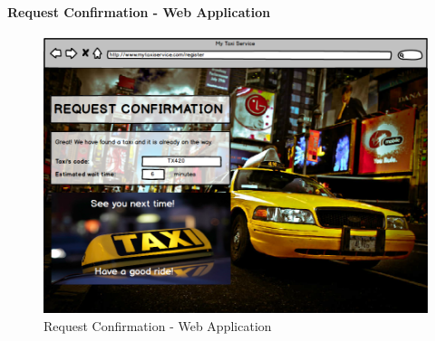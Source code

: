 \paragraph{Request Confirmation - Web Application}
\begin{figure}[!h]
	\begin{center}
		\includegraphics[scale=0.45]{../SE2_MOCKUPS/WebAppRequestConfirmation.png}
		\caption{Request Confirmation - Web Application}
	\end{center}	
\end{figure}
\newpage
